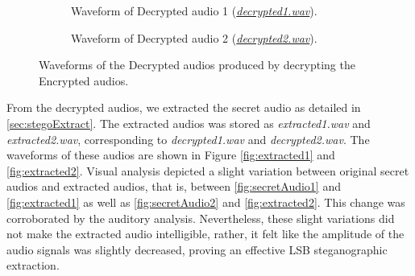 \documentclass[a4paper]{cas-sc}
\begin{document}
\begin{figure}[pos=h]
    \begin{subfigure}[h]{0.45\textwidth}
        \begin{center}
            
            \caption{Waveform of Decrypted audio 1 (\href{https://drive.google.com/file/d/1BbYutJlHVgVStUuAX9_TGZQJQnQrmKWd/view?usp=drive_link}{\textit{decrypted1.wav}}).}
            \label{fig:decrypted1}
        \end{center}
    \end{subfigure}
    \hfill
    \begin{subfigure}[h]{0.45\textwidth}
        \begin{center}
            
            \caption{Waveform of Decrypted audio 2 (\href{https://drive.google.com/file/d/1NXJOFLN7jP7fxDNhsJQ88p4ldTJE_9Pe/view?usp=drive_link}{\textit{decrypted2.wav}}).}
            \label{fig:decrypted2}
        \end{center}
    \end{subfigure}
    \caption{Waveforms of the Decrypted audios produced by decrypting the Encrypted audios.}
\end{figure}

From the decrypted audios, we extracted the secret audio as detailed in \ref{sec:stegoExtract}. The extracted audios was stored as \textit{extracted1.wav} and \textit{extracted2.wav}, corresponding to \textit{decrypted1.wav} and \textit{decrypted2.wav}. The waveforms of these audios are shown in Figure \ref{fig:extracted1} and \ref{fig:extracted2}. Visual analysis depicted a slight variation between original secret audios and extracted audios, that is, between \ref{fig:secretAudio1} and \ref{fig:extracted1} as well as \ref{fig:secretAudio2} and \ref{fig:extracted2}. This change was corroborated by the auditory analysis. Nevertheless, these slight variations did not make the extracted audio intelligible, rather, it felt like the amplitude of the audio signals was slightly decreased, proving an effective LSB steganographic extraction.
\end{document}
